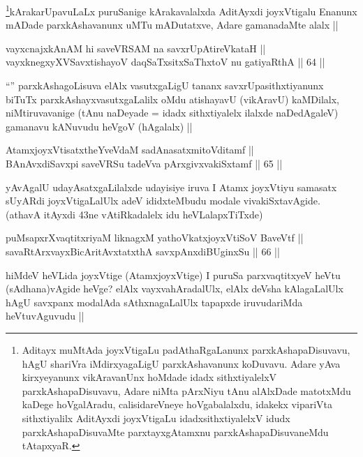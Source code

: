 \begin{artha}
\footnote{Aditayx muMtAda joyxVtigaLu padAthaRgaLanunx parxkAshapaDisuvavu, hAgU shariVra iMdirxyagaLigU parxkAshavanunx koDuvavu. Adare yAva kirxyeyanunx vikAravanUnx hoMdade idadx sithxtiyalelxV parxkAshapaDisuvavu, Adare niMta pArxNiyu tAnu alAlxDade matotxMdu kaDege hoVgalAradu, calisidareVneye hoVgabalalxdu, idakekx vipariVta sithxtiyalilx  AditAyxdi joyxVtigaLu idadxsithxtiyalelxV idudx parxkAshapaDisuvaMte parxtayxgAtamxnu parxkAshapaDisuvaneMdu tAtapxyaR.}kArakarUpavuLaLx puruSanige kArakavalalxda AditAyxdi joyxVtigalu Enanunx mADade parxkAshavanunx uMTu mADutatxve, Adare gamanadaMte alalx ||
\end{artha}

 
\begin{shl}
vayxcnajxkAnAM hi saveVRSAM na savxrUpAtireVkataH || \\
vayxknegxyXVSavxtishayoV daqSaTxsitxSaThxtoV nu gatiyaRthA ||  64 ||  
\end{shl}

\begin{artha}
``\stext'' parxkAshagoLisuva elAlx vasutxgaLigU tananx savxrUpasithxtiyanunx biTuTx parxkAshayxvasutxgaLalilx oMdu atishayavU (vikAravU) kaMDilalx, niMtiruvavanige (tAnu naDeyade = idadx sithxtiyalelx ilalxde naDedAgaleV) gamanavu kANuvudu heVgoV (hAgalalx) ||
\end{artha}

\begin{shl}
AtamxjoyxVtisatxtheYveVdaM sadAnasatxmitoVditamf || \\
BAnAvxdiSavxpi saveVRSu tadeVva pArxgivxvakiSxtamf ||  65 ||  
\end{shl}

\begin{artha}
yAvAgalU udayAsatxgaLilalxde udayisiye iruva I Atamx joyxVtiyu samasatx sUyARdi joyxVtigaLalUlx adeV ididxteMbudu modale vivakiSxtavAgide. (athavA itAyxdi 43ne vAtiRkadalelx idu heVLalapxTiTxde)
\end{artha}

\begin{shl}
puMsapxrXvaqtitxriyaM liknagxM yathoVkatxjoyxVtiSoV BaveVtf || \\
savaRtArxvayxBicAritAvxtatxthA savxpAnxdiBUginxSu ||  66 ||  
\end{shl}

\begin{artha}
hiMdeV heVLida joyxVtige (AtamxjoyxVtige) I puruSa parxvaqtitxyeV heVtu (sAdhana)vAgide heVge? elAlx vayxvahAradalUlx, elAlx deVsha kAlagaLalUlx hAgU savxpanx modalAda sAthxnagaLalUlx tapapxde iruvudariMda heVtuvAguvudu ||
\end{artha}

